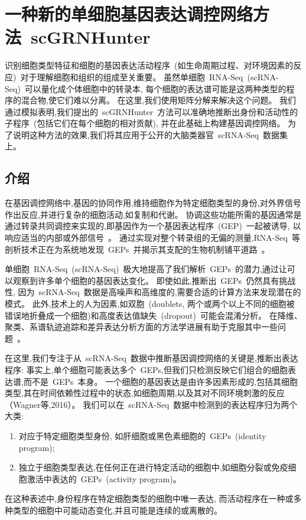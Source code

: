 \section{一种新的单细胞基因表达调控网络方法~scGRNHunter}

识别细胞类型特征和细胞的基因表达活动程序~(如生命周期过程、对环境因素的反应)~对于理解细胞和组织的组成至关重要。
虽然单细胞~RNA-Seq~(scRNA-Seq)~可以量化成个体细胞中的转录本,
每个细胞的表达谱可能是这两种类型的程序的混合物,使它们难以分离。
在这里,我们使用矩阵分解来解决这个问题。
我们通过模拟表明,我们提出的~scGRNHunter~方法可以准确地推断出身份和活动性的子程序~(包括它们在每个细胞的相对贡献), 
并在此基础上构建基因调控网络。
为了说明这种方法的效果,我们将其应用于公开的大脑类器官~scRNA-Seq~数据集上。

\subsection{介绍}
在基因调控网络中,基因的协同作用,维持细胞作为特定细胞类型的身份,对外界信号作出反应,并进行复杂的细胞活动,如复制和代谢。
协调这些功能所需的基因通常是通过转录共同调控来实现的,即基因作为一个基因表达程序~(GEP)~一起被诱导,
以响应适当的内部或外部信号~\cite{eisen1998cluster,segal2003module}。
通过实现对整个转录组的无偏的测量,RNA-Seq~等剖析技术正在为系统地发现~GEPs~并揭示其支配的生物机制铺平道路~\cite{liberzon2015molecular}。

单细胞~RNA-Seq~(scRNA-Seq)~极大地提高了我们解析~GEPs~的潜力,通过让可以观察到许多单个细胞的基因表达变化。
即使如此,推断出~GEPs~仍然具有挑战性,
因为~scRNA-Seq~数据是高噪声和高维度的,需要合适的计算方法来发现潜在的模式。
此外,技术上的人为因素,如双胞~(doublets, 两个或两个以上不同的细胞被错误地折叠成一个细胞)和高度表达值缺失~(dropout)~可能会混淆分析。
在降维、聚类、系谱轨迹追踪和差异表达分析方面的方法学进展有助于克服其中一些问题~\cite{amir2013visne,kharchenko2014bayesian,satija2015spatial,trapnell2014dynamics}。

在这里,我们专注于从~scRNA-Seq~数据中推断基因调控网络的关键是,推断出表达程序:
事实上,单个细胞可能表达多个~GEPs,但我们只检测反映它们组合的细胞表达谱,而不是~GEPs~本身。
一个细胞的基因表达是由许多因素形成的,包括其细胞类型,其在时间依赖性过程中的状态,如细胞周期,以及其对不同环境刺激的反应（Wagner等,2016）。
我们可以在~scRNA-Seq~数据中检测到的表达程序归为两个大类:
\begin{enumerate}
    \item 对应于特定细胞类型身份, 如肝细胞或黑色素细胞的~GEPs~(identity program);
    \item 独立于细胞类型表达,在任何正在进行特定活动的细胞中,如细胞分裂或免疫细胞激活中表达的~GEPs~(activity program)。
\end{enumerate}
在这种表述中,身份程序在特定细胞类型的细胞中唯一表达,
而活动程序在一种或多种类型的细胞中可能动态变化,并且可能是连续的或离散的。

